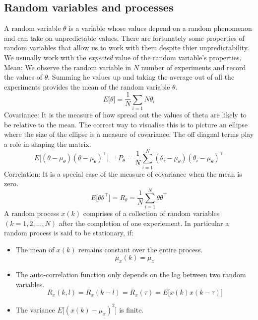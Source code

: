 \subsection{Random variables and processes} 
A random variable $\theta$ is a variable whose values depend on a random phenomenon and can take on unpredictable values. There are fortunately some properties of random variables that allow us to work with them despite thier unpredictability. We usuually work with the \emph{expected} value of the random variable's properties.\\
\newline
Mean: We observe the random variable in $N$ number of experiments and record the values of $\theta$. Summing he values up and taking the average out of all the experiments provides the mean of the random variable $\theta$. 
\begin{equation} 
	E\Big[\theta \Big] = \frac{1}{N}\sum_{i = 1}{N} \theta_{i}
\end{equation}
Covariance: It is the measure of how spread out the values of theta are likely to be relative to the mean. The correct way to visualise this is to picture an ellipse where the size of the ellipse is a measure of covariance. The off diagnal terms play a role in shaping the matrix. 
\begin{equation}
	E\Big[ (\theta - \mu_{\theta})(\theta - \mu_{\theta})^{\top} \Big] = P_{\theta} = \frac{1}{N}\sum_{i = 1}^{N}(\theta_{i} - \mu_{\theta})(\theta_{i} - \mu_{\theta})^{\top}
\end{equation}
Correlation: It is a special case of the measure of covariance when the mean is zero. 
\begin{equation}
	E\Big[\theta \theta^{\top} \Big] = R_{\theta} = \frac{1}{N} \sum_{i = 1}^{N} \theta \theta^{\top}
\end{equation}
A random process $x(k)$ comprises of a collection of random variables $(k = 1, 2,..., N)$ after the completion of one experiement. In particular a random process is said to be stationary, if: 
\begin{itemize}
	\item The mean of $x(k)$ remains constant over the entire process. 
		\begin{equation}
			\mu_{x}(k) = \mu_{x}
		\end{equation}
	\item The auto-correlation function only depends on the lag between two random variables. 
		\begin{equation}
			R_{x}(k, l) = R_{x}(k - l) = R_{x}(\tau) = E\Big[x(k)x(k-\tau) \Big]
		\end{equation}
	\item The variance $E\Big[ (x(k) - \mu_{x})^{2}\Big]$ is finite. 
\end{itemize}
